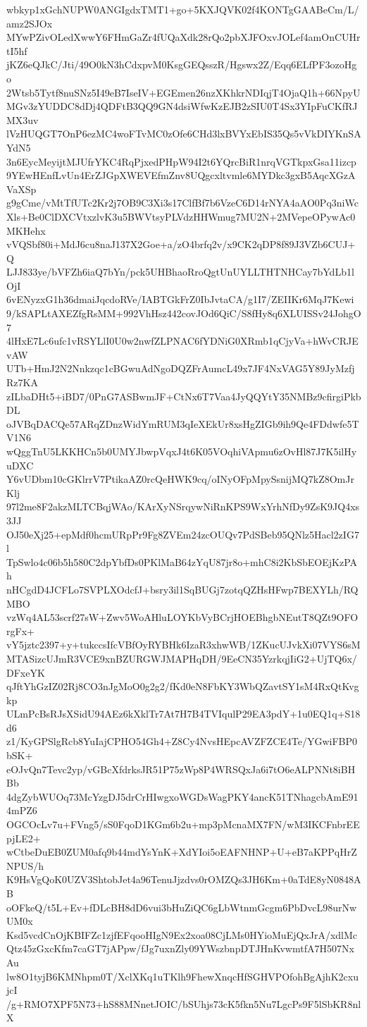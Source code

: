 wbkyp1xGchNUPW0ANGIgdxTMT1+go+5KXJQVK02f4KONTgGAABeCm/L/amz2SJOx
MYwPZivOLedXwwY6FHmGaZr4fUQaXdk28rQo2pbXJFOxvJOLef4amOnCUHrtI5hf
jKZ6eQJkC/Jti/49O0kN3hCdxpvM0KsgGEQsszR/Hgswx2Z/Eqq6ELfPF3ozoHgo
2Wtsb5Tytf8nuSNz5I49eB7IseIV+EGEmen26nzXKhkrNDIqjT4OjaQ1h+66NpyU
MGv3zYUDDC8dDj4QDFtB3QQ9GN4dsiWfwKzEJB2zSIU0T4Sx3YIpFuCKfRJMX3uv
lVzHUQGT7OnP6ezMC4woFTvMC0zOfe6CHd3lxBVYxEbIS35Qs5vVkDIYKnSAYdN5
3n6EycMeyijtMJUfrYKC4RqPjxedPHpW94I2t6YQrcBiR1nrqVGTkpxGsa11izcp
9YEwHEnfLvUn4ErZJGpXWEVEfmZnv8UQgcxltvmle6MYDkc3gxB5AqcXGzAVaXSp
g9gCme/vMtTfUTc2Kr2j7OB9C3Xi3s17ClfBf7b6VzeC6D14rNYA4aAO0Pq3niWc
Xls+Be0ClDXCVtxzlvK3u5BWVtsyPLVdzHHWmug7MU2N+2MVepeOPywAc0MKHehx
vVQSbf80i+MdJ6cu8naJ137X2Goe+a/zO4brfq2v/x9CK2qDP8f89J3VZb6CUJ+Q
LJJ833ye/bVFZh6iaQ7bYn/pck5UHBhaoRroQgtUnUYLLTHTNHCay7bYdLb1lOjI
6vENyzxG1h36dmaiJqcdoRVe/IABTGkFrZ0IbJvtaCA/g1I7/ZEIIKr6MqJ7Kewi
9/kSAPLtAXEZfgRsMM+992VhHsz442covJOd6QiC/S8fHy8q6XLUISSv24JohgO7
4lHxE7Lc6ufc1vRSYLlI0U0w2nwfZLPNAC6fYDNiG0XRmb1qCjyVa+hWvCRJEvAW
UTb+HmJ2N2Nnkzqc1cBGwuAdNgoDQZFrAumcL49x7JF4NxVAG5Y89JyMzfjRz7KA
zILbaDHt5+iBD7/0PnG7ASBwmJF+CtNx6T7Vaa4JyQQYtY35NMBz9cfirgiPkbDL
oJVBqDACQe57ARqZDnzWidYmRUM3qIeXEkUr8xsHgZIGb9ih9Qe4FDdwfe5TV1N6
wQggTnU5LKKHCn5b0UMYJbwpVqxJ4t6K05VOqhiVApmu6zOvHl87J7K5ilHyuDXC
Y6vUDbm10cGKlrrV7PtikaAZ0rcQeHWK9cq/oINyOFpMpySsnijMQ7kZ8OmJrKlj
97l2me8F2akzMLTCBqjWAo/KArXyNSrqywNiRnKPS9WxYrhNfDy9ZsK9JQ4xs3JJ
OJ50eXj25+epMdf0hcmURpPr9Fg8ZVEm24zcOUQv7PdSBeb95QNlz5Hacl2zIG7l
TpSwlo4c06b5h580C2dpYbfDs0PKlMaB64zYqU87jr8o+mhC8i2KbSbEOEjKzPAh
nHCgdD4JCFLo7SVPLXOdcfJ+bsry3il1SqBUGj7zotqQZHsHFwp7BEXYLh/RQMBO
vzWq4AL53scrf27sW+Zwv5WoAHluLOYKbVyBCrjHOEBhgbNEutT8QZt9OFOrgFx+
vY5jztc2397+y+tukccsIfcVBfOyRYBHk6IzaR3xhwWB/1ZKucUJvkXi07VYS6sM
MTASizcUJmR3VCE9xnBZURGWJMAPHqDH/9EeCN35YzrkqjIiG2+UjTQ6x/DFxeYK
qJftYhGzIZ02Rj8CO3nJgMoO0g2g2/fKd0eN8FbKY3WbQZavtSY1sM4RxQtKvgkp
ULmPcBsRJsXSidU94AEz6kXklTr7At7H7B4TVIqulP29EA3pdY+1u0EQ1q+S18d6
z1/KyGPSlgRcb8YuIajCPHO54Gh4+Z8Cy4NvsHEpcAVZFZCE4Te/YGwiFBP0bSK+
eOJvQn7Tevc2yp/vGBcXfdrksJR51P75zWp8P4WRSQxJa6i7tO6eALPNNt8iBHBb
4dgZybWUOq73McYzgDJ5drCrHIwgxoWGDsWagPKY4ancK51TNhagcbAmE914mPZ6
OGCOcLv7u+FVng5/sS0FqoD1KGm6b2u+mp3pMcnaMX7FN/wM3IKCFnbrEEpjLE2+
wCtbeDuEB0ZUM0afq9b44mdYsYnK+XdYIoi5oEAFNHNP+U+eB7aKPPqHrZNPUS/h
K9HsVgQoK0UZV3ShtobJet4a96TenuJjzdvs0rOMZQs3JH6Km+0aTdE8yN0848AB
oOFkeQ/t5L+Ev+fDLcBH8dD6vui3bHuZiQC6gLbWtnmGcgm6PbDvcL98urNwUM0x
Ksd5vcdCnOjKBIFZc1zjfEFqooHIgN9Ex2xoa08CjLMs0HYioMuEjQxJrA/xdlMc
Qtz45zGxcKfm7caGT7jAPpw/fJg7uxnZly09YWszbnpDTJHnKvwmtfA7H507NxAu
lw8O1tyjB6KMNhpm0T/XclXKq1uTKlh9FhewXnqcHfSGHVPOfohBgAjhK2cxujcI
/g+RMO7XPF5N73+hS88MNnetJOIC/bSUhjs73cK5fkn5Nu7LgcPs9F5lSbKR8nlX
